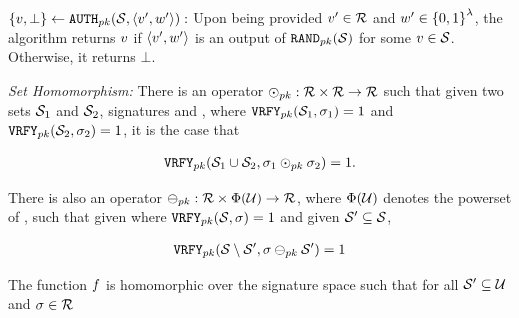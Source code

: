 \begin{definition}
		
		\item $\{\genericSigPair[1], \bot\} \assign  \verifyRand[\pubKey](\genericSetVar, \genericSigPairAlt):$ Upon 
being provided $\genericSigPairAlt[1] \in \sigOutputSpace$ and $\genericSigPairAlt[2] \in \setDefn{0,1}^{\secParam}$, the algorithm returns $\genericSigPair[1]$ if $\genericSigPairAlt$ is an output of $\randomize[\pubKey](\genericSetVar)$ for some $\genericSigPair[1] \in \genericSetVar$. Otherwise, it returns $\bot$. 
		
		
	\itemListEnd
	
	\smallskip
	\textit{Set Homomorphism:} There is an operator
	$\sigHomomorphism[\pubKey]:
	\sigOutputSpace \times \sigOutputSpace
	\rightarrow \sigOutputSpace$ such that given two sets
	$\genericSetVar[1]$ and $\genericSetVar[2]$, signatures
	\genericSig[1] and \genericSig[2], where
	$\verify[\pubKey](\genericSetVar[1], \genericSig[1]) = 1$ and
	$\verify[\pubKey](\genericSetVar[2], \genericSig[2]) = 1$, it
	is the case that
	
	
	\begin{align}
		\label{eq:sig_homomorphism_union}
		\verify[\pubKey](\genericSetVar[1] \cup \genericSetVar[2],
		\genericSig[1] \sigHomomorphism[\pubKey] \genericSig[2]) = 1.
	\end{align}
	
	There is also an operator $\sigMinus[\pubKey]: \sigOutputSpace
	\times \powerset(\universe) \rightarrow
	\sigOutputSpace$, where $\Phi(\mathcal{U})$ denotes the powerset
          of \universe, such that given \genericSig where
	$\verify[\pubKey](\genericSetVar, \genericSig) = 1$ and given
	$\genericSetVarAlt \subseteq \genericSetVar$,
	
	
	
	\begin{align}
		\verify[\pubKey](\genericSetVar \setminus \genericSetVarAlt,
		\genericSig \sigMinus[\pubKey] \genericSetVarAlt) = 1 
		\label{eq:sig_homomorphism_minus} 
			\end{align}
	

	The function $\randomizeFn$ is homomorphic over the signature space such that for all $\genericSetVar' \subseteq \universe$ and $\genericSig \in \sigOutputSpace$


\end{definition}
